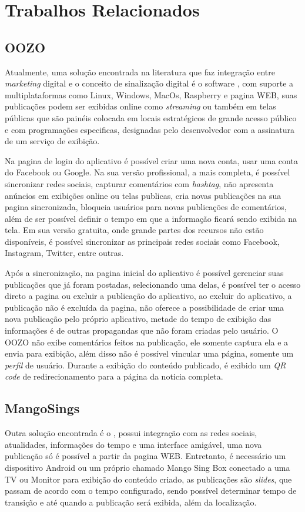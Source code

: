 \chapter[Trabalhos Relacionados]{Trabalhos Relacionados}
\section{OOZO}
Atualmente, uma solução encontrada na literatura que faz integração entre \textit{marketing} digital e o conceito de sinalização digital é o software \cite{oozo2017}, com suporte a multiplataformas como Linux, Windows, MacOs, Raspberry e pagina WEB, suas publicações podem ser exibidas online como \textit{streaming} ou também em telas públicas que são painéis colocada em locais estratégicos de grande acesso público e com programações especificas, designadas pelo desenvolvedor com a assinatura de um serviço de exibição.

Na pagina de login do aplicativo é possível criar uma nova conta, usar uma conta do Facebook ou Google. Na sua versão profissional, a mais completa, é possível sincronizar redes sociais, capturar comentários com \textit{hashtag}, não apresenta anúncios em exibições online ou telas publicas, cria novas publicações na sua pagina sincronizada, bloqueia usuários para novas publicações de comentários, além de ser possível definir o tempo em que a informação ficará sendo exibida na tela. Em sua versão gratuita, onde grande partes dos recursos não estão disponíveis, é possível sincronizar as principais redes sociais como Facebook, Instagram, Twitter, entre outras. 

Após a sincronização, na pagina inicial do aplicativo é possível gerenciar suas publicações que já foram postadas, selecionando uma delas, é possível ter o acesso direto a pagina ou excluir a publicação do aplicativo, ao excluir do aplicativo, a publicação não é excluída da pagina, não oferece a possibilidade de criar uma nova publicação pelo próprio aplicativo, metade do tempo de exibição das informações é de outras propagandas que não foram criadas pelo usuário. O OOZO não exibe comentários feitos na publicação, ele somente captura ela e a envia para exibição, além disso não é possível vincular uma página, somente um \textit{perfil} de usuário. Durante a exibição do conteúdo publicado, é exibido um \textit{QR code} de redirecionamento para a página da noticia completa.

\section{MangoSings}
Outra solução encontrada é o \cite{mango2017}, possui integração com as redes sociais, atualidades, informações do tempo e uma interface amigável, uma nova publicação só é possível a partir da pagina WEB. Entretanto, é necessário um dispositivo Android ou um próprio chamado Mango Sing Box conectado a uma TV ou Monitor para exibição do conteúdo criado, as publicações são \textit{slides}, que passam de acordo com o tempo configurado, sendo possível determinar tempo de transição e até quando a publicação será exibida, além da localização. 

